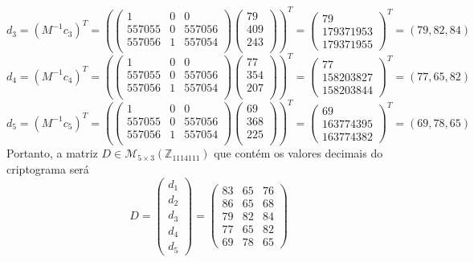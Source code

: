 \documentclass[oneside,a4paper,12pt]{article}
\theoremstyle{definition}
\theoremstyle{plain}
\theoremstyle{solu}
\theoremstyle{dotlessP}
\begin{document}
\[
d_3 = (M^{-1}c_3)^T =  \left(\begin{pmatrix}
1 & 0 & 0 \\
557055 & 0 & 557056 \\
557056 & 1 & 557054\\
\end{pmatrix}  \begin{pmatrix}
79 \\
409\\
243 \\
\end{pmatrix}\right)^T = \left(\begin{matrix}
79 \\
179371953 \\
179371955
\end{matrix}\right)^T = (79, 82, 84)
\]
\[
d_4 = (M^{-1}c_4)^T =  \left(\begin{pmatrix}
1 & 0 & 0 \\
557055 & 0 & 557056 \\
557056 & 1 & 557054\\
\end{pmatrix}  \begin{pmatrix}
77 \\
354\\
207 \\
\end{pmatrix}\right)^T = \left(\begin{matrix}
77 \\
158203827 \\
158203844
\end{matrix}\right)^T = (77, 65, 82)
\]
\[
d_5 = (M^{-1}c_5)^T =  \left(\begin{pmatrix}
1 & 0 & 0 \\
557055 & 0 & 557056 \\
557056 & 1 & 557054\\
\end{pmatrix}  \begin{pmatrix}
69 \\
368\\
225 \\
\end{pmatrix}\right)^T = \left(\begin{matrix}
69 \\
163774395 \\
163774382
\end{matrix}\right)^T = (69, 78, 65)
\]
Portanto, a matriz $D \in \mathcal{M}_{5 \times 3}(\mathbb{Z}_{1114111})$ que contém os valores decimais do criptograma será
\[
D = \begin{pmatrix}
d_1 \\
d_2 \\
d_3 \\
d_4 \\
d_5
\end{pmatrix} = \begin{pmatrix}
83 & 65 & 76 \\ 
86 & 65 & 68 \\ 
79 & 82 & 84 \\  
77 & 65 & 82 \\ 
69 & 78 & 65 
\end{pmatrix}
\]
\end{document}
